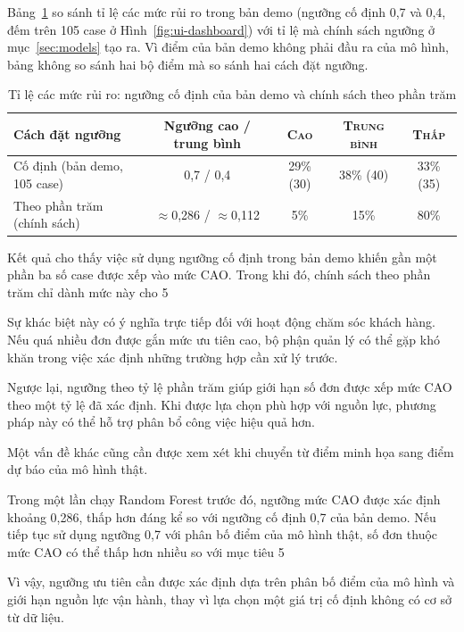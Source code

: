\documentclass[12pt,a4paper]{report}
\begin{document}
Bảng~\ref{tab:demo-threshold} so sánh tỉ lệ các mức rủi ro trong bản demo (ngưỡng cố định 0,7 và 0,4, đếm trên 105 case ở Hình~\ref{fig:ui-dashboard}) với tỉ lệ mà chính sách ngưỡng ở mục~\ref{sec:models} tạo ra. Vì điểm của bản demo không phải đầu ra của mô hình, bảng không so sánh hai bộ điểm mà so sánh hai cách đặt ngưỡng.

\begin{table}[htbp]\centering\small
\caption{Tỉ lệ các mức rủi ro: ngưỡng cố định của bản demo và chính sách theo phần trăm}\label{tab:demo-threshold}
\begin{tabular}{lcccc}
\toprule
Cách đặt ngưỡng & Ngưỡng cao / trung bình & \textsc{Cao} & \textsc{Trung bình} & \textsc{Thấp} \\
\midrule
Cố định (bản demo, 105 case)        & 0,7 / 0,4         & 29\% (30) & 38\% (40) & 33\% (35) \\
Theo phần trăm (chính sách)         & $\approx$0,286 / $\approx$0,112 & 5\%  & 15\% & 80\% \\
\bottomrule
\end{tabular}
\end{table}

Kết quả cho thấy việc sử dụng ngưỡng cố định trong bản demo khiến gần một phần ba số case được xếp vào mức CAO. Trong khi đó, chính sách theo phần trăm chỉ dành mức này cho 5%

Sự khác biệt này có ý nghĩa trực tiếp đối với hoạt động chăm sóc khách hàng. Nếu quá nhiều đơn được gắn mức ưu tiên cao, bộ phận quản lý có thể gặp khó khăn trong việc xác định những trường hợp cần xử lý trước.

Ngược lại, ngưỡng theo tỷ lệ phần trăm giúp giới hạn số đơn được xếp mức CAO theo một tỷ lệ đã xác định. Khi được lựa chọn phù hợp với nguồn lực, phương pháp này có thể hỗ trợ phân bổ công việc hiệu quả hơn.

Một vấn đề khác cũng cần được xem xét khi chuyển từ điểm minh họa sang điểm dự báo của mô hình thật.

Trong một lần chạy Random Forest trước đó, ngưỡng mức CAO được xác định khoảng 0,286, thấp hơn đáng kể so với ngưỡng cố định 0,7 của bản demo. Nếu tiếp tục sử dụng ngưỡng 0,7 với phân bố điểm của mô hình thật, số đơn thuộc mức CAO có thể thấp hơn nhiều so với mục tiêu 5%

Vì vậy, ngưỡng ưu tiên cần được xác định dựa trên phân bố điểm của mô hình và giới hạn nguồn lực vận hành, thay vì lựa chọn một giá trị cố định không có cơ sở từ dữ liệu.
\end{document}
